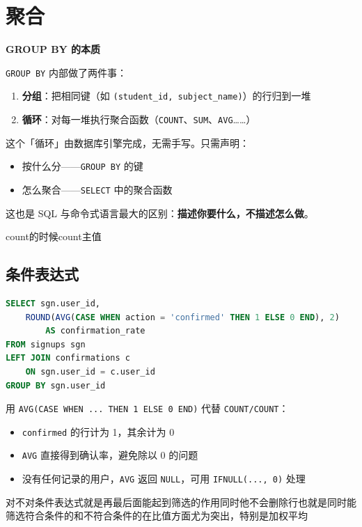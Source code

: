 \section{聚合}
\begin{dxtips}
    
\textbf{GROUP BY 的本质}

\texttt{GROUP BY} 内部做了两件事：
\begin{enumerate}
    \item \textbf{分组}：把相同键（如 \texttt{(student\_id, subject\_name)}）的行归到一堆
    \item \textbf{循环}：对每一堆执行聚合函数（\texttt{COUNT}、\texttt{SUM}、\texttt{AVG}……）
\end{enumerate}

这个「循环」由数据库引擎完成，无需手写。只需声明：
\begin{itemize}
    \item 按什么分——\texttt{GROUP BY} 的键
    \item 怎么聚合——\texttt{SELECT} 中的聚合函数
\end{itemize}

这也是 SQL 与命令式语言最大的区别：\textbf{描述你要什么，不描述怎么做}。

\end{dxtips}
\begin{dxtips}
    count的时候count主值
\end{dxtips}
\begin{solution}
\subsection{条件表达式}
\begin{lstlisting}[language=SQL]
SELECT sgn.user_id,
    ROUND(AVG(CASE WHEN action = 'confirmed' THEN 1 ELSE 0 END), 2)
        AS confirmation_rate
FROM signups sgn
LEFT JOIN confirmations c
    ON sgn.user_id = c.user_id
GROUP BY sgn.user_id
\end{lstlisting}

\begin{note}
用 \texttt{AVG(CASE WHEN ... THEN 1 ELSE 0 END)} 代替 \texttt{COUNT/COUNT}：
\begin{itemize}
    \item \texttt{confirmed} 的行计为 1，其余计为 0
    \item \texttt{AVG} 直接得到确认率，避免除以 0 的问题
    \item 没有任何记录的用户，\texttt{AVG} 返回 \texttt{NULL}，可用 \texttt{IFNULL(..., 0)} 处理
\end{itemize}
\end{note}
\begin{dxtips}
   对不对条件表达式就是再最后面能起到筛选的作用同时他不会删除行也就是同时能筛选符合条件的和不符合条件的在比值方面尤为突出，特别是加权平均
\end{dxtips}
\end{solution}
